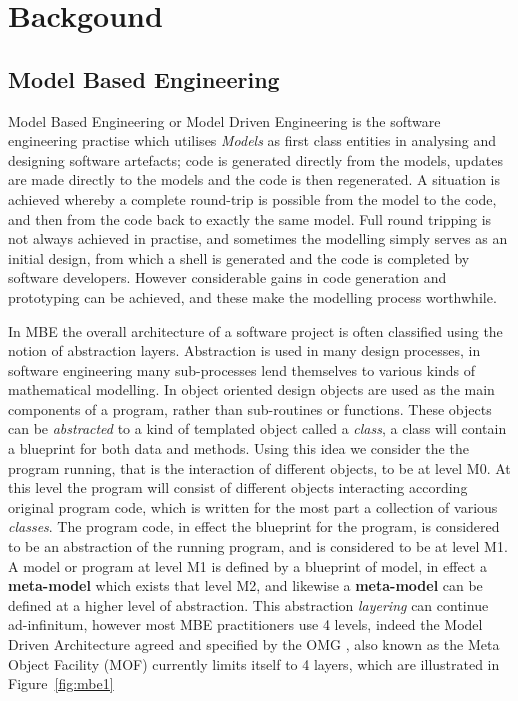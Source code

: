 \documentclass{llncs}
\begin{document}
\section{Backgound}

\subsection{Model Based Engineering}
Model Based Engineering or Model Driven Engineering is the software engineering practise which utilises \emph{Models} as first class entities in analysing and designing software artefacts; code is generated directly from the models, updates are made directly to the models and the code is then regenerated. A situation is achieved whereby a complete round-trip is possible from the model to the code, and then from the code back to exactly the same model. Full round tripping is not always achieved in practise, and sometimes the modelling simply serves as an initial design, from which a shell is generated and the code is completed by software developers. However considerable gains in code generation and prototyping can be achieved, and these make the modelling process worthwhile.

In MBE the overall architecture of a software project is often classified using the notion of abstraction layers. Abstraction is used in many design processes, in software engineering many sub-processes lend themselves to various kinds of mathematical modelling.  In object oriented design objects are used as the main components of a program, rather than sub-routines or functions.  These objects can be \emph{abstracted} to a kind of templated object called a \emph{class}, a class will contain a blueprint for both data and methods.  Using this idea we consider the the program running, that is the interaction of different objects, to be at level M0.  At this level the program will consist of different objects interacting according original program code, which is written for the most part a collection of various \emph{classes}.  The program code, in effect the blueprint for the program, is considered to be an abstraction of the running program, and is considered to be at level M1.  A model or program at level M1 is defined by a blueprint of model, in effect a \textbf{meta-model} which exists that level M2, and likewise a \textbf{meta-model} can be defined at a higher level of abstraction.  This abstraction \emph{layering} can continue ad-infinitum, however most MBE practitioners use 4 levels, indeed the Model Driven Architecture agreed and specified by the OMG \cite{MOF242}, also known as the Meta Object Facility (MOF) currently limits itself to 4 layers, which are illustrated in Figure~\ref{fig:mbe1}
\end{document}
